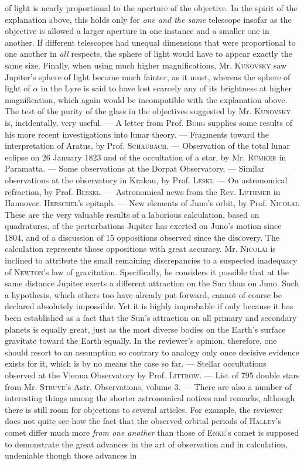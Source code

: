 of light is nearly proportional to the aperture of the objective. In the spirit of the explanation above, this holds only for \emph{one and the same} telescope insofar as the objective is allowed a larger aperture in one instance and a smaller one in another. If different telescopes had unequal dimensions that were proportional to one another in \emph{all} respects, the sphere of light would have to appear exactly the same size. Finally, when using much higher magnifications, Mr. \textsc{Kunovsky} saw Jupiter's sphere of light become much fainter, as it must, whereas the sphere of light of $\alpha$ in the Lyre is said to have lost scarcely any of its brightness at higher magnification, which again would be incompatible with the explanation above. The test of the purity of the glass in the objectives suggested by Mr. \textsc{Kunovsky} is, incidentally, very useful. --- A letter from Prof. \textsc{Bürg} supplies some results of his more recent investigations into lunar theory. --- Fragments toward the interpretation of Aratus, by Prof. \textsc{Schaubach}. --- Observation of the total lunar eclipse on 26 January 1823 and of the occultation of a star, by Mr. \textsc{Rümker} in Paramatta. --- Some observations at the Dorpat Observatory. --- Similar observations at the observatory in Krakau, by Prof. \textsc{Leski}. --- On astronomical refraction, by Prof. \textsc{Bessel}. --- Astronomical news from the Rev. \textsc{Luthmer} in Hannover. \textsc{Herschel}'s epitaph. --- New elements of Juno's orbit, by Prof. \textsc{Nicolai}. These are the very valuable results of a laborious calculation, based on quadratures, of the perturbations Jupiter has exerted on Juno's motion since 1804, and of a discussion of 15 oppositions observed since the discovery. The calculation represents those oppositions with great accuracy. Mr. \textsc{Nicolai} is inclined to attribute the small remaining discrepancies to a suspected inadequacy of \textsc{Newton}'s law of gravitation. Specifically, he considers it possible that at the same distance Jupiter exerts a different attraction on the Sun than on Juno. Such a hypothesis, which others too have already put forward, cannot of course be declared absolutely impossible. Yet it is highly improbable if only because it has been established as a fact that the Sun's attraction on all primary and secondary planets  is equally great, just as the most diverse bodies on the Earth's surface gravitate toward the Earth equally. In the reviewer's opinion, therefore, one should resort to an assumption so contrary to analogy only once decisive evidence exists for it, which is by no means the case so far. --- Stellar occultations observed at the Vienna Observatory by Prof. \textsc{Littrow}. --- List of 795 double stars from Mr. \textsc{Struve}'s Astr. Observations, volume 3. --- There are also a number of interesting things among the shorter astronomical notices and remarks, although there is still room for objections to several articles. For example, the reviewer does not quite see how the fact that the observed orbital periods of \textsc{Halley}'s comet differ much more \emph{from one another} than those of \textsc{Enke}'s comet is supposed to demonstrate the great advances in the art of observation and in calculation, undeniable though those advances in 